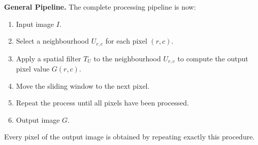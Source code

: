 \highspace
\textcolor{Green3}{ \textbf{General Pipeline.}} The complete processing pipeline is now:
\begin{enumerate}
    \item Input image $I$.
    \item Select a neighbourhood $U_{r,c}$ for each pixel $\left(r,c\right)$.
    \item Apply a spatial filter $T_U$ to the neighbourhood $U_{r,c}$ to compute the output pixel value $G\left(r,c\right)$.
    \item Move the sliding window to the next pixel.
    \item Repeat the process until all pixels have been processed.
    \item Output image $G$.
\end{enumerate}
Every pixel of the output image is obtained by repeating exactly this procedure.